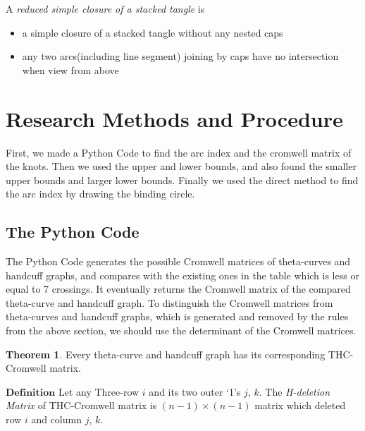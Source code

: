 \documentclass{article}
\theoremstyle{definition}
\newtheorem{defn}[thm]{Definition}
\theoremstyle{theorem}
\newtheorem{theorem}[thm]{Theorem}
\theoremstyle{proposition}
\theoremstyle{corollary}
\begin{document}
A \textit{reduced simple closure of a stacked tangle} is
\begin{itemize}
    \item a simple closure of a stacked tangle without any nested caps
    \item any two arcs(including line segment) joining by caps have no intersection when view from above
\end{itemize}


\section{Research Methods and Procedure}
First, we made a Python Code to find the arc index and the cromwell matrix of the knots. Then we used the upper and lower bounds, and also found the smaller upper bounds and larger lower bounds. Finally we used the direct method to find the arc index by drawing the binding circle.

\subsection{The Python Code}
The Python Code generates the possible Cromwell matrices of theta-curves and handcuff graphs, and compares with the existing ones in the table which is less or equal to 7 crossings.
It eventually returns the Cromwell matrix of the compared theta-curve and handcuff graph.
To distinguish the Cromwell matrices from theta-curves and handcuff graphs, which is generated and removed by the rules from the above section, we should use the determinant of the Cromwell matrices.\\

\begin{theorem}
Every theta-curve and handcuff graph has its corresponding THC-Cromwell matrix.
\end{theorem}
$\mathbf{Definition}$ Let any Three-row $i$ and its two outer `1's $j$, $k$. The \textit{H-deletion Matrix} of THC-Cromwell matrix is $(n-1)\times(n-1)$ matrix which deleted row $i$ and column $j$, $k$.\\
\end{document}
